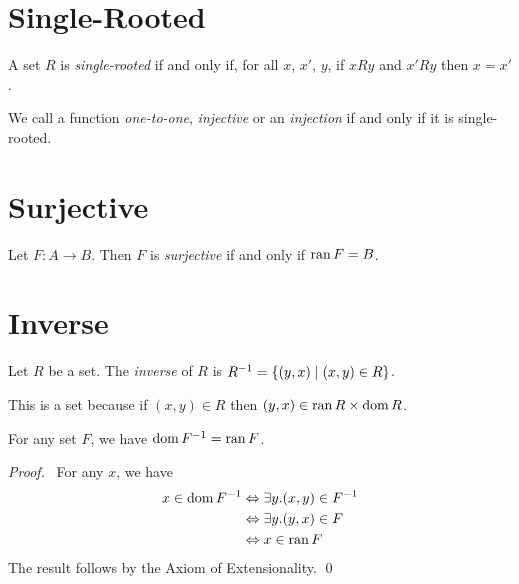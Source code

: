 \section{Single-Rooted}

\begin{definition}
    A set $R$ is \emph{single-rooted} if and only if, for all $x$, $x'$, $y$, if $xRy$ and $x'Ry$ then $x = x'$.

    We call a function \emph{one-to-one}, \emph{injective} or an \emph{injection}
     if and only if it is single-rooted.
\end{definition}

\section{Surjective}

\begin{definition}[Surjective]
    Let $F : A \rightarrow B$. Then $F$ is \emph{surjective} if and only if
    $\operatorname{ran} F = B$.
\end{definition}

\section{Inverse}

\begin{definition}
    Let $R$ be a set. The \emph{inverse} of $R$ is ${R}^{-1} = \{ (y,x) \mid (x,y) \in R \}$.

    This is a set because if $(x,y) \in R$ then $(y,x) \in \operatorname{ran} R \times \operatorname{dom} R$.
\end{definition}

\begin{theorem}
    \label{theorem:dom_inv}
    For any set $F$, we have $\operatorname{dom} {F}^{-1} = \operatorname{ran} F$.
\end{theorem}

\begin{proof}
    \pf\ For any $x$, we have
    \begin{align*}
        x \in \operatorname{dom} {F}^{-1} & \Leftrightarrow \exists y. (x,y) \in {F}^{-1} \\
        & \Leftrightarrow \exists y. (y,x) \in F \\
        & \Leftrightarrow x \in \operatorname{ran} F
    \end{align*}
    The result follows by the Axiom of Extensionality. \qed
\end{proof}

